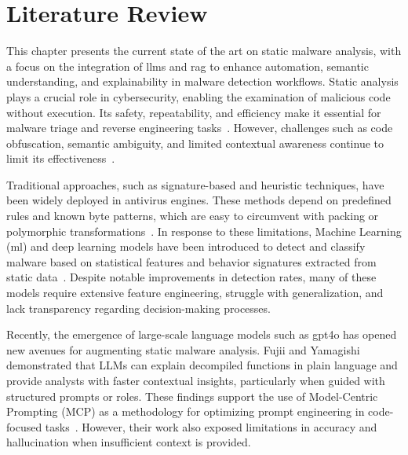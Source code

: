 \chapter{Literature Review}\label{sec:LiteratureReview}\label{Chapter2} %
This chapter presents the current state of the art on static malware analysis, with a focus on the
integration of \glspl{llm} and \gls{rag} to enhance automation, semantic understanding, and
explainability in malware detection workflows. Static analysis plays a crucial role in
cybersecurity, enabling the examination of malicious code without execution. Its safety,
repeatability, and efficiency make it essential for malware triage and reverse engineering
tasks~\cite{fedak2020fundamentals}. However, challenges such as code obfuscation, semantic
ambiguity, and limited contextual awareness continue to limit its
effectiveness~\cite{gaber2024malware, cassanova2022systematic}.

Traditional approaches, such as signature-based and heuristic techniques, have been widely deployed
in antivirus engines. These methods depend on predefined rules and known byte patterns, which are
easy to circumvent with packing or polymorphic transformations~\cite{patil2014computer}. In
response to these limitations, Machine Learning (\gls{ml}) and deep learning models have been
introduced to detect and classify malware based on statistical features and behavior signatures
extracted from static data~\cite{cassanova2022systematic, gaber2024malware}. Despite notable
improvements in detection rates, many of these models require extensive feature engineering,
struggle with generalization, and lack transparency regarding decision-making processes.

Recently, the emergence of large-scale language models such as \gls{gpt4o} has opened new avenues
for augmenting static malware analysis. Fujii and Yamagishi~\cite{fujii2024llm} demonstrated that
\gls{LLMs} can explain decompiled functions in plain language and provide analysts with faster
contextual insights, particularly when guided with structured prompts or roles. These findings
support the use of Model-Centric Prompting (MCP) as a methodology for optimizing prompt engineering
in code-focused tasks~\cite{sahoo2024systematic}. However, their work also exposed limitations in
accuracy and hallucination when insufficient context is provided.

